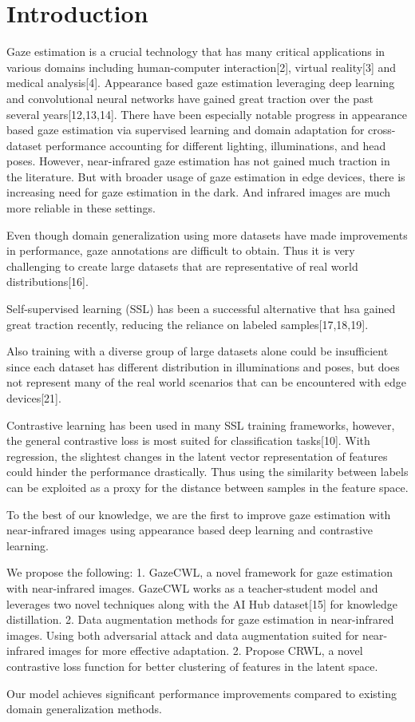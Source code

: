 \section{Introduction}
\label{sec:intro}
Gaze estimation is a crucial technology that has many critical applications in various domains including human-computer interaction[2], virtual reality[3] and medical analysis[4]. Appearance based gaze estimation leveraging deep learning and convolutional neural networks have gained great traction over the past several years[12,13,14]. There have been especially notable progress in appearance based gaze estimation via supervised learning and domain adaptation for cross-dataset performance accounting for different lighting, illuminations, and head poses. However, near-infrared gaze estimation has not gained much traction in the literature. But with broader usage of gaze estimation in edge devices, there is increasing need for gaze estimation in the dark. And infrared images are much more reliable in these settings. 

Even though domain generalization using more datasets have made improvements in performance, gaze annotations are difficult to obtain. Thus it is very challenging to create large datasets that are representative of real world distributions[16]. 

Self-supervised learning (SSL) has been a successful alternative that hsa gained great traction recently, reducing the reliance on labeled samples[17,18,19]. 

Also training with a diverse group of large datasets alone could be insufficient since each dataset has different distribution in illuminations and poses, but does not represent many of the real world scenarios that can be encountered with edge devices[21].

Contrastive learning has been used in many SSL training frameworks, however, the general contrastive loss is most suited for classification tasks[10]. With regression, the slightest changes in the latent vector representation of features could hinder the performance drastically. Thus using the similarity between labels can be exploited as a proxy for the distance between samples in the feature space. 

To the best of our knowledge, we are the first to improve gaze estimation with near-infrared images using appearance based deep learning and contrastive learning. 

We propose the following:
1. GazeCWL, a novel framework for gaze estimation with near-infrared images. GazeCWL works as a teacher-student model and leverages two novel techniques along with the AI Hub dataset[15] for knowledge distillation. 
2. Data augmentation methods for gaze estimation in near-infrared images. Using both adversarial attack and data augmentation suited for near-infrared images for more effective adaptation. 
2. Propose CRWL, a novel contrastive loss function for better clustering of features in the latent space. 

Our model achieves significant performance improvements compared to existing domain generalization methods. 